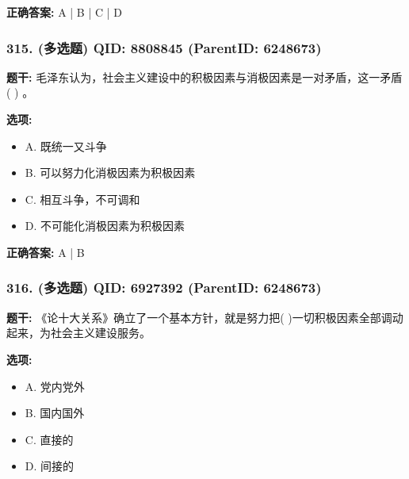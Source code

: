 \documentclass[12pt,UTF8]{ctexart}
\begin{document}
\textbf{正确答案:}
A | B | C | D

\vspace{0.3em}\hrulefill\vspace{0.7em}

\subsubsection*{315. (多选题) \small QID: 8808845 (ParentID: 6248673)}

\textbf{题干:}
毛泽东认为，社会主义建设中的积极因素与消极因素是一对矛盾，这一矛盾 ( ) 。



\textbf{选项:}
\begin{itemize}[leftmargin=*]

  \item A. 既统一又斗争

  \item B. 可以努力化消极因素为积极因素

  \item C. 相互斗争，不可调和

  \item D. 不可能化消极因素为积极因素

\end{itemize}

\textbf{正确答案:}
A | B

\vspace{0.3em}\hrulefill\vspace{0.7em}

\subsubsection*{316. (多选题) \small QID: 6927392 (ParentID: 6248673)}

\textbf{题干:}
《论十大关系》确立了一个基本方针，就是努力把(          )一切积极因素全部调动起来，为社会主义建设服务。



\textbf{选项:}
\begin{itemize}[leftmargin=*]

  \item A. 党内党外

  \item B. 国内国外

  \item C. 直接的

  \item D. 间接的

\end{itemize}
\end{document}
